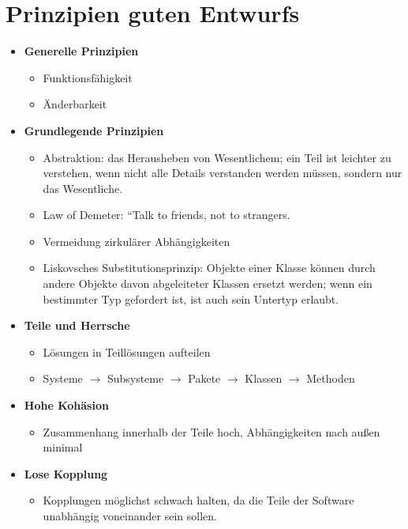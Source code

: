 \section{Prinzipien guten Entwurfs}

\begin{tcolorbox}[title=Prinzipien guten Entwurfs]

    \begin{itemize}
        \item \textbf{Generelle Prinzipien}
        \begin{itemize}
            \item Funktionsfähigkeit
            \item Änderbarkeit
        \end{itemize}
        \item \textbf{Grundlegende Prinzipien}
        \begin{itemize}
            \item Abstraktion:  das Herausheben von Wesentlichem;  ein Teil ist leichter zu verstehen, wenn nicht alle Details verstanden werden müssen, sondern nur das Wesentliche.
            \item Law of Demeter: ``Talk to friends, not to strangers.
            \item Vermeidung zirkulärer Abhängigkeiten
            \item Liskovsches Substitutionsprinzip: Objekte einer Klasse können durch andere Objekte davon abgeleiteter Klassen ersetzt werden; wenn ein bestimmter Typ gefordert ist, ist auch sein Untertyp erlaubt.
        \end{itemize}
        \item \textbf{Teile und Herrsche}
        \begin{itemize}
            \item Lösungen in Teillösungen aufteilen
            \item Systeme $\rightarrow$ Subsysteme $\rightarrow$ Pakete $\rightarrow$  Klassen $\rightarrow$ Methoden
        \end{itemize}
        \item \textbf{Hohe Kohäsion}
        \begin{itemize}
            \item Zusammenhang innerhalb der Teile hoch, Abhängigkeiten nach außen minimal
        \end{itemize}
        \item \textbf{Lose Kopplung}
        \begin{itemize}
            \item Kopplungen möglichst schwach halten, da die Teile der Software unabhängig voneinander sein sollen.
        \end{itemize}
    \end{itemize}

\end{tcolorbox}